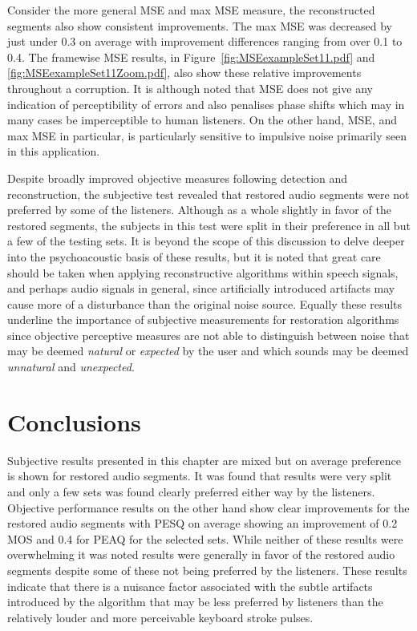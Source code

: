 Consider the more general MSE and max MSE measure, the reconstructed segments also show consistent improvements. The max MSE was decreased by just under 0.3 on average with improvement differences ranging from over 0.1 to 0.4. The framewise MSE results, in Figure~\ref{fig:MSEexampleSet11.pdf} and \ref{fig:MSEexampleSet11Zoom.pdf}, also show these relative improvements throughout a corruption. It is although noted that MSE does not give any indication of perceptibility of errors and also penalises phase shifts which may in many cases be imperceptible to human listeners. On the other hand, MSE, and max MSE in particular, is particularly sensitive to impulsive noise primarily seen in this application.


Despite broadly improved objective measures following detection and reconstruction, the subjective test revealed that restored audio segments were not preferred by some of the listeners. Although as a whole slightly in favor of the restored segments, the subjects in this test were split in their preference in all but a few of the testing sets. It is beyond the scope of this discussion to delve deeper into the psychoacoustic basis of these results, but it is noted that great care should be taken when applying reconstructive algorithms within speech signals, and perhaps audio signals in general, since artificially introduced artifacts may cause more of a disturbance than the original noise source. Equally these results underline the importance of subjective measurements for restoration algorithms since objective perceptive measures are not able to distinguish between noise that may be deemed \emph{natural} or \emph{expected} by the user and which sounds may be deemed \emph{unnatural} and \emph{unexpected}.

\section{Conclusions}
Subjective results presented in this chapter are mixed but on average preference is shown for restored audio segments. It was found that results were very split and only a few sets was found clearly preferred either way by the listeners. Objective performance results on the other hand show clear improvements for the restored audio segments with PESQ on average showing an improvement of 0.2 MOS and 0.4 for PEAQ for the selected sets. While neither of these results were overwhelming it was noted results were generally in favor of the restored audio segments despite some of these not being preferred by the listeners. These results indicate that there is a nuisance factor associated with the subtle artifacts introduced by the algorithm that may be less preferred by listeners than the relatively louder and more perceivable keyboard stroke pulses.

